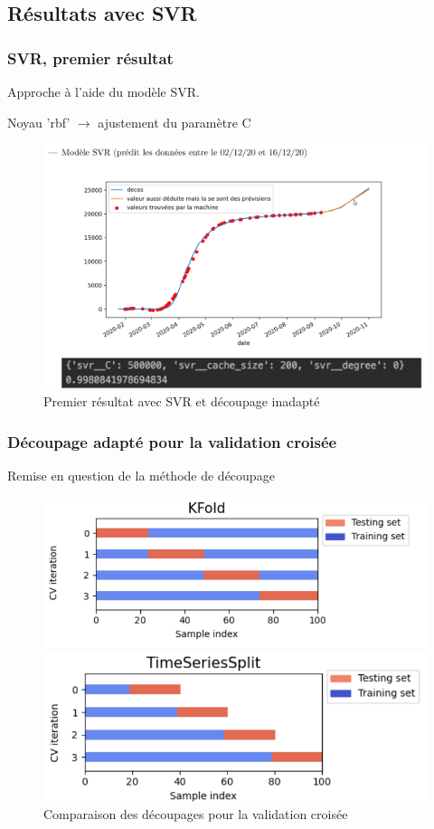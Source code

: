 \documentclass{beamer}
\begin{document}
\subsection{Résultats avec SVR}
\begin{frame}
	\frametitle{SVR, premier résultat}
	Approche à l'aide du modèle SVR. 
	
	Noyau 'rbf' $\rightarrow$ ajustement du paramètre C
	\begin{figure}[tc]
		\includegraphics[scale=0.2]{SVR_premierdecoup}
		\centering
		\caption{Premier résultat avec SVR et découpage inadapté}
	\end{figure}
\end{frame}

\begin{frame}
	\frametitle{Découpage adapté pour la validation croisée}
		Remise en question de la méthode de découpage
		\begin{figure}[h]
			\centering
			\begin{minipage}{0.5\textwidth}
				\includegraphics[scale=0.3]{kfold}
			\end{minipage}
			\centering
			\begin{minipage}{0.5\textwidth}
				\includegraphics[scale=0.3]{tscv}
			\end{minipage}
		\caption{Comparaison des découpages pour la validation croisée}
		\end{figure}
\end{frame}
\end{document}
